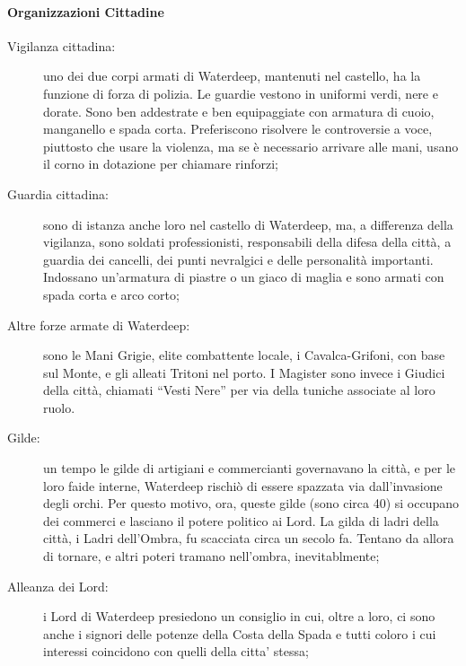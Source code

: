 \documentclass{article}
\begin{document}
                  \paragraph{Organizzazioni Cittadine}

                          \begin{description}
                              \item[Vigilanza cittadina:] uno dei due corpi armati di Waterdeep, mantenuti nel castello, ha la funzione di forza di polizia. Le guardie vestono in uniformi verdi, nere e dorate. Sono ben addestrate e ben equipaggiate con armatura di cuoio, manganello e spada corta. Preferiscono risolvere le controversie a voce, piuttosto che usare la violenza, ma se è necessario arrivare alle mani, usano il corno in dotazione per chiamare rinforzi;
                              
                              \item[Guardia cittadina:] sono di istanza anche loro nel castello di Waterdeep, ma, a differenza della vigilanza, sono soldati professionisti, responsabili della difesa della città, a guardia dei cancelli, dei punti nevralgici e delle personalità importanti. Indossano un’armatura di piastre o un giaco di maglia e sono armati con spada corta e arco corto;
                              
                              \item[Altre forze armate di Waterdeep:] sono le Mani Grigie, elite combattente locale, i Cavalca-Grifoni, con base sul Monte, e gli alleati Tritoni nel porto. I Magister sono invece i Giudici della città, chiamati “Vesti Nere” per via della tuniche associate al loro ruolo.
                              
                              \item[Gilde:] un tempo le gilde di artigiani e commercianti governavano la città, e per le loro faide interne, Waterdeep rischiò di essere spazzata via dall’invasione degli orchi. Per questo motivo, ora, queste gilde (sono circa 40) si occupano dei commerci e lasciano il potere politico ai Lord. La gilda di ladri della città, i Ladri dell’Ombra, fu scacciata circa un secolo fa. Tentano da allora di tornare, e altri poteri tramano nell’ombra, inevitablmente;
                              
                              \item[Alleanza dei Lord:] i Lord di Waterdeep presiedono un consiglio in cui, oltre a loro, ci sono anche i signori delle potenze della Costa della Spada e tutti coloro i cui interessi coincidono con quelli della citta’ stessa;
                              

\end{description}
\end{document}
